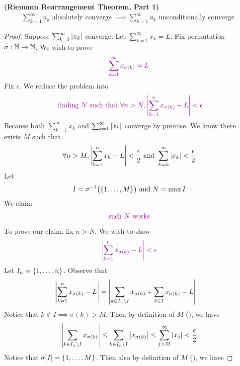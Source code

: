 \documentclass{report}
\begin{document}
\begin{theorem}
\label{2}
\textbf{(Riemann Rearrangement Theorem, Part 1)}  
\begin{align*}
\sum_{k=1}^\infty a_k \text{ absolutely converge }\implies  \sum_{k=1}^\infty a_k \text{ unconditionally converge }
\end{align*}
\end{theorem}
\begin{proof}
Suppose $\sum_{k=1}^\infty \left|x_k\right|$ converge. Let $\sum_{k=1}^\infty x_k=L$. Fix permutation $\sigma :\mathbb{N}\rightarrow \mathbb{N}$. We wish to prove 
\begin{align*}
  \textcolor{violet}{\sum_{k=1}^\infty x_{\sigma(k)}=L}
\end{align*}
Fix $\epsilon $. We reduce the problem into  
 \begin{align*}
   \textcolor{violet}{\text{ finding $N$ such that }\forall n>N, \left|\sum_{k=1}^n x_{\sigma (k)}- L\right| <\epsilon }
\end{align*}
Because both $\sum_{k=1}^\infty x_k$ and $\sum_{k=1}^\infty \left|x_k\right|$ converge by premise. We know there exists $M$ such that 
\begin{align}
\label{e5}
  \forall n>M, \left|\sum_{k=1}^n x_k -L\right|<\frac{\epsilon}{2}\text{ and } \sum_{k=n}^\infty \left|x_k\right|<\frac{\epsilon}{2}
\end{align}
Let 
\begin{align*}
I=\sigma^{-1}\big(\{ 1,\dots ,M \} \big)\text{ and }N=\max I
\end{align*}
We claim 
\begin{align*}
\textcolor{violet}{\text{ such $N$ works }}
\end{align*}
To prove our claim, fix $n>N$. We wish to show 
 \begin{align*}
   \textcolor{violet}{\left|\sum_{k=1}^n x_{\sigma (k)}-L\right|<\epsilon }
\end{align*}
Let $I_n=\{ 1,\dots , n \}$. Observe that 
\begin{align}
\label{e6}
\left|\sum_{k=1}^n x_{\sigma(k)}-L\right|&= \left|\sum_{k \in I_n \setminus I} x_{\sigma (k)}+ \sum_{k \in I} x_{\sigma (k)} - L \right|
\end{align}
Notice that $k \not \in I \implies  \sigma (k)>M$. Then by definition of $M$  (), we have
\begin{align}
  \label{e7}
\left|\sum_{k \in I_n \setminus I} x_{\sigma (k)} \right|\leq \sum_{k \in I_n \setminus  I} \left|x_{\sigma(k)}\right|\leq \sum_{j>M}^\infty \left|x_j\right|< \frac{\epsilon}{2}
\end{align}
Notice that $\sigma [I]=\{ 1,\dots , M \}$. Then also by definition of $M$  (), we have 

\end{proof}
\end{document}
